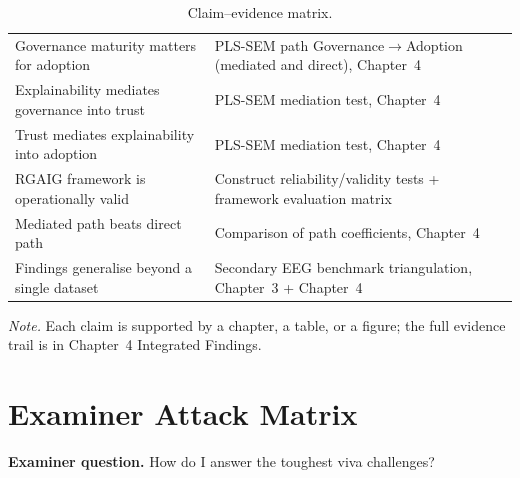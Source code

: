 {\tablestripes\tablefontsize
{}
\begin{xltabular}{\textwidth}{@{} >{\raggedright\arraybackslash}p{5.0cm} L @{}}
\caption[Claim--evidence matrix]{Claim--evidence matrix.}\label{tab:dist_claim_evidence} \\
\toprule
{} &  \\
\midrule
\endfirsthead
\endhead
\bottomrule
\endlastfoot
Governance maturity matters for adoption & PLS-SEM path Governance$\rightarrow$Adoption (mediated and direct), Chapter~4 \\
\addlinespace
Explainability mediates governance into trust & PLS-SEM mediation test, Chapter~4 \\
\addlinespace
Trust mediates explainability into adoption & PLS-SEM mediation test, Chapter~4 \\
\addlinespace
RGAIG framework is operationally valid & Construct reliability/validity tests + framework evaluation matrix \\
\addlinespace
Mediated path beats direct path & Comparison of path coefficients, Chapter~4 \\
\addlinespace
Findings generalise beyond a single dataset & Secondary EEG benchmark triangulation, Chapter~3 + Chapter~4 \\
\end{xltabular}}

\vspace{0.3em}\noindent\textit{Note.} Each claim is supported by a chapter, a table, or a figure; the full evidence trail is in Chapter~4 Integrated Findings.


\section{Examiner Attack Matrix}
\label{app:distinction_attack_matrix}

\noindent\textbf{Examiner question.} How do I answer the toughest viva challenges?

